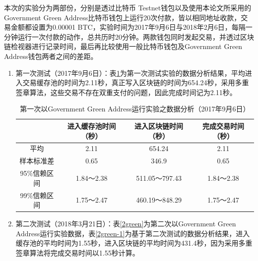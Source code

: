		本次的实验分为两部份，分别是透过比特币 Testnet钱包以及使用本论文所采用的Government Green Address比特币钱包上运行20次付款，皆以相同地址收款，交易金额都设置为0.00001 BTC，实验时间为2017年9月6日与2018年2月6日，每隔一分钟运行一次付款的动作，总共历时20分钟。两款钱包同时发起交易，并透过区块链检视器进行记录时间，最后再比较使用一般比特币钱包及Government Green Address钱包两者之间的差距。

		\begin{enumerate}
			\item 第一次测试（2017年9月6日）：表\ref{1green}为第一次测试实验的数据分析结果，平均进入交易缓存池的时间为2.11秒，真正写入区块链的时间为654.24秒，采用多重签章算法，这些交易不存在双重支付的问题，因此完成时间记为2.11秒。

			\begin{table}[!htbp]
				\centering
				\caption{第一次以Government Green Address运行实验之数据分析（2017年9月6日）}
				\label{1green}
				\begin{tabular}{|c|c|c|c|}
				\hline
				         & 进入缓存池时间（秒） & 进入区块链时间（秒）    & 完成交易时间（秒） \\ \hline
				平均       & 2.11       & 654.24        & 2.11      \\ \hline
				样本标准差    & 0.65       & 346.9         & 0.65      \\ \hline
				95\%信赖区间 & 1.84～2.38  & 511.05～797.43 & 1.84～2.38 \\ \hline
				99\%信赖区间 & 1.75～2.47  & 460.19～848.29 & 1.75～2.47 \\ \hline
				\end{tabular}
				\end{table}

			\item 第二次测试（2018年3月21日）：表\ref{2green}为第二次以Government Green Address运行实验数据，表\ref{2green-1}为基于第二次测试的数据分析结果，进入缓存池的平均时间为1.55秒，进入区块链的平均时间为431.4秒，因为采用多重签章算法将完成交易时间以1.55秒计算。

		\end{enumerate}
